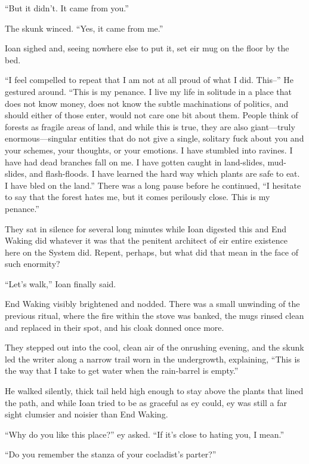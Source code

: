 ``But it didn't. It came from you.''

The skunk winced. ``Yes, it came from me.''

Ioan sighed and, seeing nowhere else to put it, set eir mug on the floor by the bed.

``I feel compelled to repeat that I am not at all proud of what I did. This--'' He gestured around. ``This is my penance. I live my life in solitude in a place that does not know money, does not know the subtle machinations of politics, and should either of those enter, would not care one bit about them. People think of forests as fragile areas of land, and while this is true, they are also giant---truly enormous---singular entities that do not give a single, solitary fuck about you and your schemes, your thoughts, or your emotions. I have stumbled into ravines. I have had dead branches fall on me. I have gotten caught in land-slides, mud-slides, and flash-floods. I have learned the hard way which plants are safe to eat. I have bled on the land.'' There was a long pause before he continued, ``I hesitate to say that the forest hates me, but it comes perilously close. This is my penance.''

They sat in silence for several long minutes while Ioan digested this and End Waking did whatever it was that the penitent architect of eir entire existence here on the System did. Repent, perhaps, but what did that mean in the face of such enormity?

``Let's walk,'' Ioan finally said.

End Waking visibly brightened and nodded. There was a small unwinding of the previous ritual, where the fire within the stove was banked, the mugs rinsed clean and replaced in their spot, and his cloak donned once more.

They stepped out into the cool, clean air of the onrushing evening, and the skunk led the writer along a narrow trail worn in the undergrowth, explaining, ``This is the way that I take to get water when the rain-barrel is empty.''

He walked silently, thick tail held high enough to stay above the plants that lined the path, and while Ioan tried to be as graceful as ey could, ey was still a far sight clumsier and noisier than End Waking.

``Why do you like this place?'' ey asked. ``If it's close to hating you, I mean.''

``Do you remember the stanza of your cocladist's parter?''

